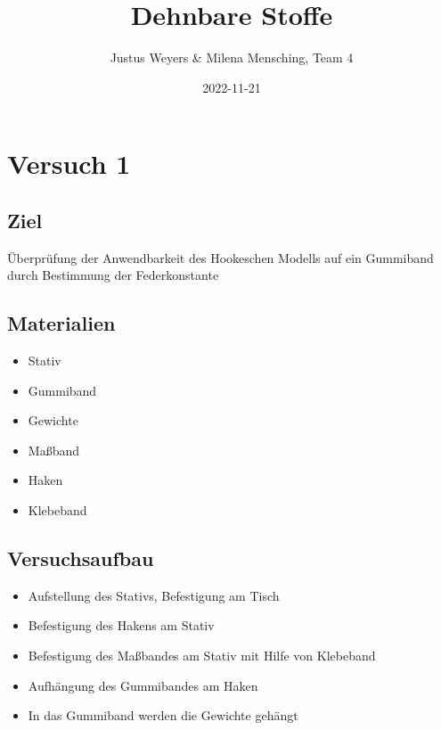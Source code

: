 \documentclass[
  9pt,
]{article}
\title{Dehnbare Stoffe}
\author{Justus Weyers \& Milena Mensching, Team 4}
\date{2022-11-21}
\providecommand{\tightlist}{%
  \setlength{\itemsep}{0pt}\setlength{\parskip}{0pt}}
\begin{document}
\maketitle

\hypertarget{versuch-1}{%
\section{Versuch 1}\label{versuch-1}}

\hypertarget{ziel}{%
\subsection{Ziel}\label{ziel}}

Überprüfung der Anwendbarkeit des Hookeschen Modells auf ein Gummiband
durch Bestimmung der Federkonstante

\hypertarget{materialien}{%
\subsection{Materialien}\label{materialien}}

\begin{itemize}
\tightlist
\item
  Stativ
\item
  Gummiband
\item
  Gewichte
\item
  Maßband
\item
  Haken
\item
  Klebeband
\end{itemize}

\hypertarget{versuchsaufbau}{%
\subsection{Versuchsaufbau}\label{versuchsaufbau}}

\begin{itemize}
\tightlist
\item
  Aufstellung des Stativs, Befestigung am Tisch
\item
  Befestigung des Hakens am Stativ
\item
  Befestigung des Maßbandes am Stativ mit Hilfe von Klebeband
\item
  Aufhängung des Gummibandes am Haken
\item
  In das Gummiband werden die Gewichte gehängt
\end{itemize}
\end{document}
